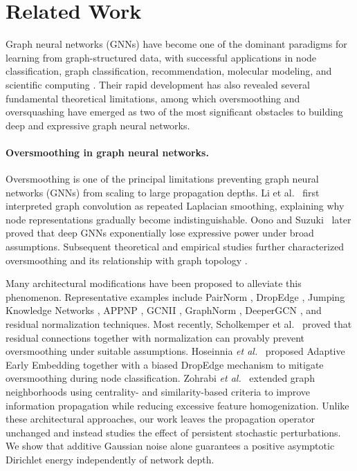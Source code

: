 \documentclass{article}
\begin{document}
\section{Related Work}
\label{sec:relatedwork}

Graph neural networks (GNNs) have become one of the dominant paradigms
for learning from graph-structured data, with successful applications
in node classification, graph classification, recommendation,
molecular modeling, and scientific computing
\cite{kipf2017,hamilton2017,velivckovic2018,xu2019gin,HaghirChehreghani2022Nature}.
Their rapid development has also revealed several fundamental
theoretical limitations, among which oversmoothing and oversquashing
have emerged as two of the most significant obstacles to building deep
and expressive graph neural networks.

\paragraph{Oversmoothing in graph neural networks.}

Oversmoothing is one of the principal limitations preventing graph neural
networks (GNNs) from scaling to large propagation depths.
Li et al.~\cite{li2018deeper} first interpreted graph convolution as repeated
Laplacian smoothing, explaining why node representations gradually become
indistinguishable.
Oono and Suzuki~\cite{oono2020graph} later proved that deep GNNs
exponentially lose expressive power under broad assumptions.
Subsequent theoretical and empirical studies further characterized
oversmoothing and its relationship with graph topology
\cite{nt2020revisiting,elinas2023revisiting}.

Many architectural modifications have been proposed to alleviate this
phenomenon.
Representative examples include PairNorm
\cite{zhao2020pairnorm},
DropEdge
\cite{rong2020dropedge},
Jumping Knowledge Networks
\cite{xu2018jknet},
APPNP
\cite{klicpera2019predict},
GCNII
\cite{chen2020gcnii},
GraphNorm
\cite{cai2021graphnorm},
DeeperGCN
\cite{li2020deepergcn},
and residual normalization techniques.
Most recently,
Scholkemper et al.~\cite{scholkemper2025}
proved that residual connections together with normalization can
provably prevent oversmoothing under suitable assumptions.
Hoseinnia \emph{et al.}~\cite{hoseinnia2025}
proposed Adaptive Early Embedding together with a biased DropEdge
mechanism to mitigate oversmoothing during node classification.
Zohrabi \emph{et al.}~\cite{zohrabi2024}
extended graph neighborhoods using centrality- and similarity-based
criteria to improve information propagation while reducing excessive
feature homogenization.
Unlike these architectural approaches,
our work leaves the propagation operator unchanged and instead studies the
effect of persistent stochastic perturbations.
We show that additive Gaussian noise alone guarantees a positive asymptotic
Dirichlet energy independently of network depth.
\end{document}
